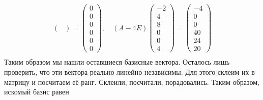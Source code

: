 \begin{gather*}
\begin{pmatrix}
    \end{pmatrix} = \begin{pmatrix}
        0\\0\\0\\0\\0\\0
    \end{pmatrix},\quad
    (A - 4E)\begin{pmatrix}
        -2\\4\\8\\0\\0\\4
    \end{pmatrix} = \begin{pmatrix}
        -4\\0\\0\\40\\24\\20
    \end{pmatrix}\\
\end{gather*}
Таким образом мы нашли оставшиеся базисные вектора. Осталось лишь проверить, что эти вектора реально линейно независимы. Для этого склеим их в матрицу и посчитаем её ранг. Склеили, посчитали, порадовались. Таким образом, искомый базис равен

